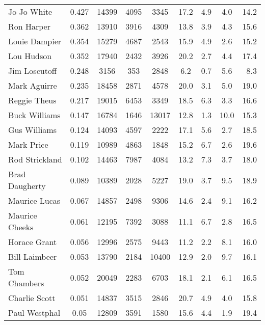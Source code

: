 \documentclass[paper=a4, fontsize=11pt]{scrartcl} %
\numberwithin{equation}{section} %
\numberwithin{figure}{section} %
\numberwithin{table}{section} %
\begin{document}
\begin{table}[thb]
\begin{tabular}{l*{7}{c}r}
Jo Jo White & 0.427 & 14399 & 4095 & 3345 & 17.2 & 4.9 & 4.0 & 14.2 \\
Ron Harper & 0.362 & 13910 & 3916 & 4309 & 13.8 & 3.9 & 4.3 & 15.6 \\
Louie Dampier & 0.354 & 15279 & 4687 & 2543 & 15.9 & 4.9 & 2.6 & 15.2 \\
Lou Hudson & 0.352 & 17940 & 2432 & 3926 & 20.2 & 2.7 & 4.4 & 17.4 \\
Jim Loscutoff & 0.248 & 3156 & 353 & 2848 & 6.2 & 0.7 & 5.6 & 8.3 \\
Mark Aguirre & 0.235 & 18458 & 2871 & 4578 & 20.0 & 3.1 & 5.0 & 19.0 \\
Reggie Theus & 0.217 & 19015 & 6453 & 3349 & 18.5 & 6.3 & 3.3 & 16.6 \\
Buck Williams & 0.147 & 16784 & 1646 & 13017 & 12.8 & 1.3 & 10.0 & 15.3 \\
Gus Williams & 0.124 & 14093 & 4597 & 2222 & 17.1 & 5.6 & 2.7 & 18.5 \\
Mark Price & 0.119 & 10989 & 4863 & 1848 & 15.2 & 6.7 & 2.6 & 19.6 \\
Rod Strickland & 0.102 & 14463 & 7987 & 4084 & 13.2 & 7.3 & 3.7 & 18.0 \\
Brad Daugherty & 0.089 & 10389 & 2028 & 5227 & 19.0 & 3.7 & 9.5 & 18.9 \\
Maurice Lucas & 0.067 & 14857 & 2498 & 9306 & 14.6 & 2.4 & 9.1 & 16.2 \\
Maurice Cheeks & 0.061 & 12195 & 7392 & 3088 & 11.1 & 6.7 & 2.8 & 16.5 \\
Horace Grant & 0.056 & 12996 & 2575 & 9443 & 11.2 & 2.2 & 8.1 & 16.0 \\
Bill Laimbeer & 0.053 & 13790 & 2184 & 10400 & 12.9 & 2.0 & 9.7 & 16.1 \\
Tom Chambers & 0.052 & 20049 & 2283 & 6703 & 18.1 & 2.1 & 6.1 & 16.5 \\
Charlie Scott & 0.051 & 14837 & 3515 & 2846 & 20.7 & 4.9 & 4.0 & 15.8 \\
Paul Westphal & 0.05 & 12809 & 3591 & 1580 & 15.6 & 4.4 & 1.9 & 19.4 \\
\end{tabular}
\end{table}
\end{document}
